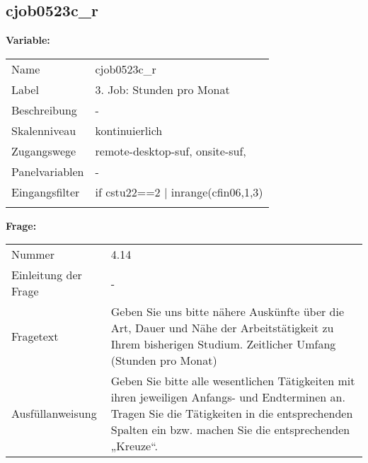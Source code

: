 	
	
	\subsection{cjob0523c\_r}
	\label{subSection:cjob0523c_r}

	\noindent\textbf{Variable:}\\
		\begin{tabular}{lL{11.3cm}}
			\label{tableVariable:cjob0523c_r}
			Name & cjob0523c\_r \\
			Label & 3. Job: Stunden pro Monat \\
			Beschreibung & - \\
			Skalenniveau & kontinuierlich \\
			Zugangswege &
				remote-desktop-suf,
				onsite-suf,
 \\
			Panelvariablen & -
			 \\
			Eingangsfilter & if cstu22==2 | inrange(cfin06,1,3) \\
 \\
		\end{tabular}

		\vspace*{1 cm}
		\noindent\textbf{Frage:}\\
		\begin{tabular}{lL{11.3cm}}
			\label{tableQuestion:cjob0523c_r}
			Nummer & 4.14 \\
			Einleitung der Frage & - \\
			Fragetext & Geben Sie uns bitte nähere Auskünfte über die Art, Dauer und Nähe der Arbeitstätigkeit zu Ihrem bisherigen Studium.
Zeitlicher Umfang
(Stunden pro Monat) \\
			Ausfüllanweisung & Geben Sie bitte alle wesentlichen Tätigkeiten mit ihren jeweiligen Anfangs- und Endterminen an. Tragen Sie die Tätigkeiten in die entsprechenden Spalten ein bzw. machen Sie die entsprechenden „Kreuze“. \\
		\end{tabular}




